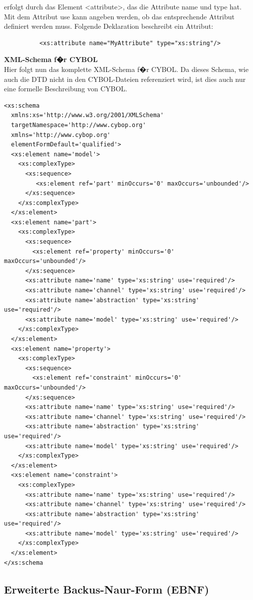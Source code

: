         erfolgt durch das Element <attribute>, das die Attribute name und type hat. 
        Mit dem Attribut use kann angeben werden, ob das entsprechende Attribut definiert werden muss.
        Folgende Deklaration beschreibt ein Attribut:
\begin{verbatim}
          <xs:attribute name="MyAttribute" type="xs:string"/>
\end{verbatim}
\newpage
      \textbf{XML-Schema f�r CYBOL} \\
      Hier folgt nun das komplette XML-Schema f�r CYBOL. Da dieses Schema, wie auch die DTD nicht
      in den CYBOL-Dateien referenziert wird, ist dies auch nur eine formelle Beschreibung von CYBOL.
\begin{verbatim}
<xs:schema 
  xmlns:xs='http://www.w3.org/2001/XMLSchema'
  targetNamespace='http://www.cybop.org'
  xmlns='http://www.cybop.org'
  elementFormDefault='qualified'>
  <xs:element name='model'>
    <xs:complexType>
      <xs:sequence>
         <xs:element ref='part' minOccurs='0' maxOccurs='unbounded'/>
      </xs:sequence>
    </xs:complexType>
  </xs:element>
  <xs:element name='part'>
    <xs:complexType>
      <xs:sequence>
        <xs:element ref='property' minOccurs='0' maxOccurs='unbounded'/>
      </xs:sequence>
      <xs:attribute name='name' type='xs:string' use='required'/>
      <xs:attribute name='channel' type='xs:string' use='required'/>
      <xs:attribute name='abstraction' type='xs:string' use='required'/>
      <xs:attribute name='model' type='xs:string' use='required'/>
    </xs:complexType>
  </xs:element>
  <xs:element name='property'>
    <xs:complexType>
      <xs:sequence>
        <xs:element ref='constraint' minOccurs='0' maxOccurs='unbounded'/>
      </xs:sequence>
      <xs:attribute name='name' type='xs:string' use='required'/>
      <xs:attribute name='channel' type='xs:string' use='required'/>
      <xs:attribute name='abstraction' type='xs:string' use='required'/>
      <xs:attribute name='model' type='xs:string' use='required'/>
    </xs:complexType>
  </xs:element>
  <xs:element name='constraint'>
    <xs:complexType>
      <xs:attribute name='name' type='xs:string' use='required'/>
      <xs:attribute name='channel' type='xs:string' use='required'/>
      <xs:attribute name='abstraction' type='xs:string' use='required'/>
      <xs:attribute name='model' type='xs:string' use='required'/>
    </xs:complexType>
  </xs:element>
</xs:schema
\end{verbatim}

    \subsection{Erweiterte Backus-Naur-Form (EBNF)}
    

